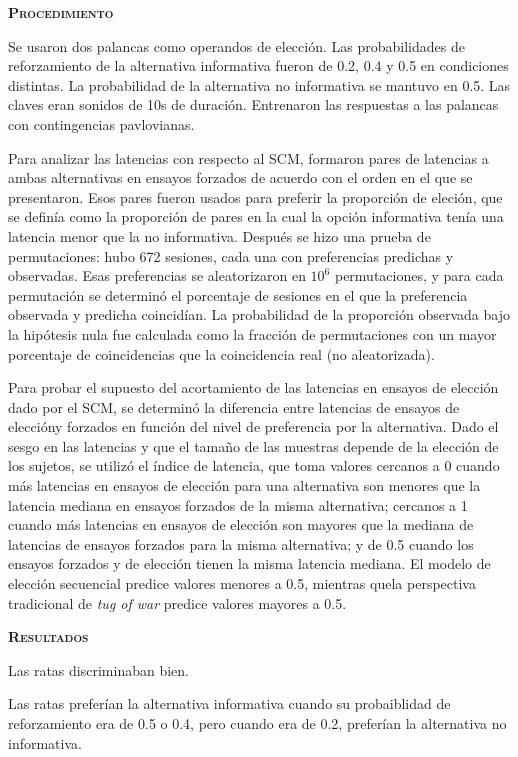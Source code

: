 \documentclass[a4paper,12pt]{article}
\begin{document}
{\scshape\bfseries Procedimiento}

Se usaron dos palancas como operandos de elección. Las probabilidades de reforzamiento de la alternativa informativa fueron de 0.2, 0.4 y 0.5 en condiciones distintas. La probabilidad de la alternativa no informativa se mantuvo en 0.5. Las claves eran sonidos de 10s de duración. Entrenaron las respuestas a las palancas con contingencias pavlovianas.

Para analizar las latencias con respecto al SCM, formaron pares de latencias a ambas alternativas en ensayos forzados de acuerdo con el orden en el que se presentaron. Esos pares fueron usados para preferir la proporción de eleción, que se definía como la proporción de pares en la cual la opción informativa tenía una latencia menor que la no informativa. Después se hizo una prueba de permutaciones: hubo 672 sesiones, cada una con preferencias predichas y observadas. Esas preferencias se aleatorizaron en $10^6$ permutaciones, y para cada permutación se determinó el porcentaje de sesiones en el que la preferencia observada y predicha coincidían. La probabilidad de la proporción observada bajo la hipótesis nula fue calculada como la fracción de permutaciones con un mayor porcentaje de coincidencias que la coincidencia real (no aleatorizada).

Para probar el supuesto del acortamiento de las latencias en ensayos de elección dado por el SCM, se determinó la diferencia entre latencias de ensayos de eleccióny forzados en función del nivel de preferencia por la alternativa. Dado el sesgo en las latencias y que el tamaño de las muestras depende de la elección de los sujetos, se utilizó el índice de latencia, que toma valores cercanos a 0 cuando más latencias en ensayos de elección para una alternativa son menores que la latencia mediana en ensayos forzados de la misma alternativa; cercanos a 1 cuando más latencias en ensayos de elección son mayores que la mediana de latencias de ensayos forzados para la misma alternativa; y de 0.5 cuando los ensayos forzados y de elección tienen la misma latencia mediana. El modelo de elección secuencial predice valores menores a 0.5, mientras quela perspectiva tradicional de {\itshape tug of war} predice valores mayores a 0.5.

{\scshape\bfseries Resultados}

Las ratas discriminaban bien.

Las ratas preferían la alternativa informativa cuando su probaiblidad de reforzamiento era de 0.5 o 0.4, pero cuando era de 0.2, preferían la alternativa no informativa.
\end{document}
